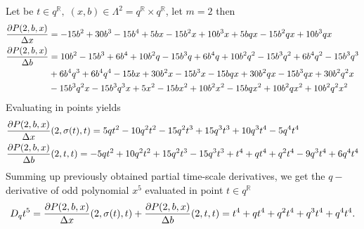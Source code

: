 \begin{examp}
    \label{time_scale_qn_example_2}
    Let be $t\in q^{\mathbb{R}}, \; (x,b) \in \Lambda^2 = q^{\mathbb{R}} \times q^{\mathbb{R}}$, let $m=2$ then
    \begin{align*}
        \frac{\partial P ( 2, b, x )}{\Delta x}
        &= -15 b^2 + 30 b^3 - 15 b^4 + 5 b x - 15 b^2 x + 10 b^3 x + 5 b q x - 15 b^2 q x + 10 b^3 q x \\
        \frac{\partial P ( 2, b, x )}{\Delta b}
        &= 10 b^2 - 15 b^3 + 6 b^4 + 10 b^2 q - 15 b^3 q + 6 b^4 q
        + 10 b^2 q^2 - 15 b^3 q^2 + 6 b^4 q^2 - 15 b^3 q^3 \\
        &+ 6 b^4 q^3 + 6 b^4 q^4 - 15 b x + 30 b^2 x - 15 b^3 x - 15 b q x + 30 b^2 q x
        - 15 b^3 q x + 30 b^2 q^2 x \\
        &- 15 b^3 q^2 x - 15 b^3 q^3 x + 5 x^2 - 15 b x^2 + 10 b^2 x^2 - 15 b q x^2 + 10 b^2 q x^2 + 10 b^2 q^2 x^2
    \end{align*}
    Evaluating in points yields
    \begin{align*}
        &\frac{\partial P ( 2, b, x )}{\Delta x} (2, \sigma(t), t)
        = 5 q t^2 - 10 q^2 t^2 - 15 q^2 t^3 + 15 q^3 t^3 + 10 q^3 t^4 - 5 q^4 t^4 \\
        &\frac{\partial P ( 2, b, x )}{\Delta b} (2, t, t)
        = -5 q t^2 + 10 q^2 t^2 + 15 q^2 t^3 - 15 q^3 t^3 + t^4 + q t^4 + q^2 t^4 - 9 q^3 t^4 + 6 q^4 t^4
    \end{align*}
    Summing up previously obtained partial time-scale derivatives, we get the $q-$derivative of odd polynomial
    $x^{5}$ evaluated in point $t\in q^{\mathbb{R}}$
    \begin{align*}
        D_{q} t^{5}
        = \frac{\partial P ( 2, b, x )}{\Delta x} (2, \sigma(t), t)
        + \frac{\partial P ( 2, b, x )}{\Delta b} (2, t, t)
        = t^4 + q t^4 + q^2 t^4 + q^3 t^4 + q^4 t^4.
    \end{align*}
\end{examp}
